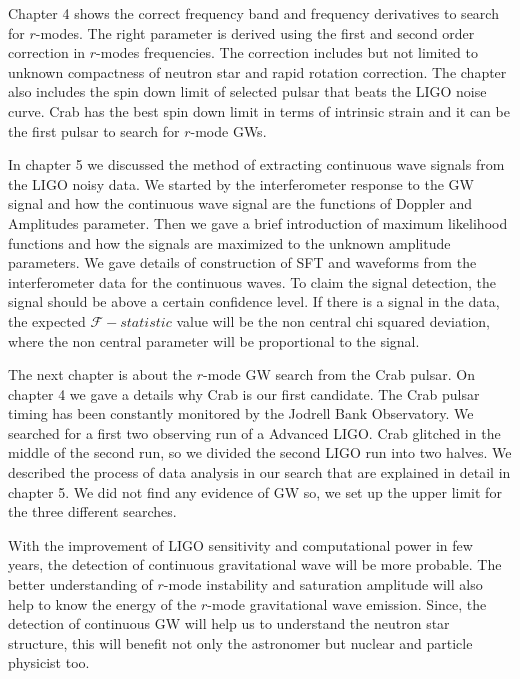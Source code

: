 \documentclass{ttuthes2007}
\begin{document}
Chapter 4 shows the correct frequency band and frequency derivatives to search
for $r$-modes. The right parameter is derived using the first and second order
correction in $r$-modes frequencies. The correction includes but not limited to
unknown compactness of neutron star and rapid rotation correction.  The chapter
also includes the spin down limit of selected pulsar that beats the LIGO noise
curve. Crab has the best spin down limit in terms of intrinsic strain and it can
be the first pulsar to search for $r$-mode \acp{GW}. 

In chapter 5 we discussed the method of extracting continuous wave signals from
the \ac{LIGO} noisy data. We started by the interferometer response to the
\ac{GW} signal and how the continuous wave signal are the functions of Doppler
and Amplitudes parameter. Then we gave a brief introduction of maximum
likelihood functions and how the signals are maximized to the unknown amplitude
parameters. We gave details of construction of \ac{SFT} and waveforms
from the interferometer data for the continuous waves. To claim the signal
detection, the signal should be above a certain confidence level. If there is a
signal in the data, the expected $\mathcal{F}-statistic$ value will be the non
central chi squared deviation, where the non central parameter will be
proportional to the signal. 

The next chapter is about the $r$-mode \ac{GW} search from the Crab pulsar. On
chapter 4 we gave a details why Crab is our first candidate. The Crab pulsar
timing has been constantly monitored by the Jodrell Bank Observatory. We
searched for a first two observing run of a Advanced \ac{LIGO}. Crab glitched in
the middle of the second run, so we divided the second \ac{LIGO} run into two
halves. We described the process of data analysis in our search that are
explained in detail in chapter 5. We did not find any evidence of \ac{GW} so, we
set up the upper limit for the three different searches.   

With the improvement of \ac{LIGO} sensitivity and computational power in few
years, the detection of continuous gravitational wave will be more probable. The
better understanding of $r$-mode instability and saturation amplitude will also
help to know the energy of the $r$-mode gravitational wave emission. Since, the
detection of continuous \ac{GW} will help us to understand the neutron star
structure, this will benefit not only the astronomer but nuclear and particle
physicist too.
\end{document}
